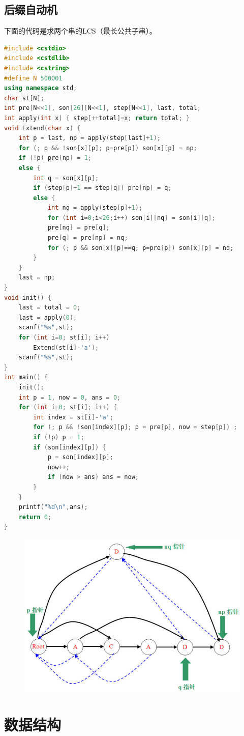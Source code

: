 \documentclass{article}
\begin{document}
\subsection{后缀自动机}
下面的代码是求两个串的LCS（最长公共子串）。
\begin{lstlisting}[language=C++]
#include <cstdio>
#include <cstdlib>
#include <cstring>
#define N 500001
using namespace std;
char st[N];
int pre[N<<1], son[26][N<<1], step[N<<1], last, total;
int apply(int x) { step[++total]=x; return total; }
void Extend(char x) {
	int p = last, np = apply(step[last]+1);
	for (; p && !son[x][p]; p=pre[p]) son[x][p] = np;
	if (!p) pre[np] = 1;
	else {
		int q = son[x][p];
		if (step[p]+1 == step[q]) pre[np] = q;
		else {
			int nq = apply(step[p]+1);
			for (int i=0;i<26;i++) son[i][nq] = son[i][q];
			pre[nq] = pre[q];
			pre[q] = pre[np] = nq;
			for (; p && son[x][p]==q; p=pre[p]) son[x][p] = nq;
		}
	}
	last = np;
}
void init() {
	last = total = 0;
	last = apply(0);
	scanf("%s",st);
	for (int i=0; st[i]; i++)
		Extend(st[i]-'a');
	scanf("%s",st);
}
int main() {
	init();
	int p = 1, now = 0, ans = 0;
	for (int i=0; st[i]; i++) {
		int index = st[i]-'a';
		for (; p && !son[index][p]; p = pre[p], now = step[p]) ;
		if (!p) p = 1;
		if (son[index][p]) {
			p = son[index][p];
			now++;
			if (now > ans) ans = now;
		}
	}
	printf("%d\n",ans);
	return 0;
}
\end{lstlisting}
\begin{figure}[htbp]
  \centering
  \includegraphics[scale=0.6]{suffix_auto.jpg}
\end{figure}

\section{数据结构}
\end{document}
